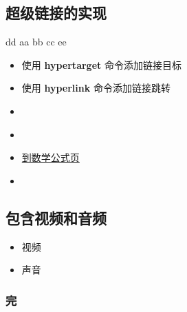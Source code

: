 \documentclass[12pt,a4paper,CJK]{beamer}
\begin{document}
\begin{CJK*}{UTF8}{gkai}
\subsection{超级链接的实现}
\begin{frame}{\subsecname}
  \hypertarget<1>{jumptofirst}{dd}
  \hypertarget<2>{jumptosecond}{aa}
  \hypertarget<3>{jumptothird}{bb}
  \hypertarget<4>{jumptoforth}{cc}
  \hypertarget<5>{jumptofifth}{ee}
  \begin{itemize}
  \item<1-> 使用 \textbf{hypertarget} 命令添加链接目标
  \item<2-> 使用 \textbf{hyperlink} 命令添加链接跳转
  \item<3->
    \hyperlink{jumptoforth}{}
  \item<4->
  \item<5->
    \hyperlink{math<5>}{到数学公式页}
  \item<6->
    \hyperlink{jumptofirst}{}
  \end{itemize}
\end{frame}

\subsection{包含视频和音频}
\begin{frame}{\subsecname}
\begin{itemize}
  \item 视频 \\
  \item 声音 \\
  \end{itemize}
\end{frame}


\frame
{
  \frametitle{完}
  \hypertarget{end}{}
}

\end{CJK*}
\end{document}
